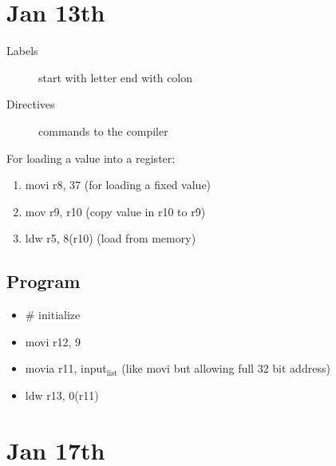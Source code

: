 \documentclass[11pt]{article}
\begin{document}
\section{Jan 13th}
\label{sec:orgheadline7}
\begin{description}
\item[{Labels}] start with letter end with colon
\item[{Directives}] commands to the compiler
\end{description}

For loading a value into a register:
\begin{enumerate}
\item movi r8, 37 (for loading a fixed value)
\item mov r9, r10 (copy value in r10 to r9)
\item ldw r5, 8(r10) (load from memory)
\end{enumerate}

\subsection{Program}
\label{sec:orgheadline6}
\begin{itemize}
\item \# initialize
\item movi r12, 9
\item movia r11, input\(_{\text{list}}\) (like movi but allowing full 32 bit address)
\item ldw r13, 0(r11)
\end{itemize}
\section{Jan 17th}
\label{sec:orgheadline13}
\end{document}
